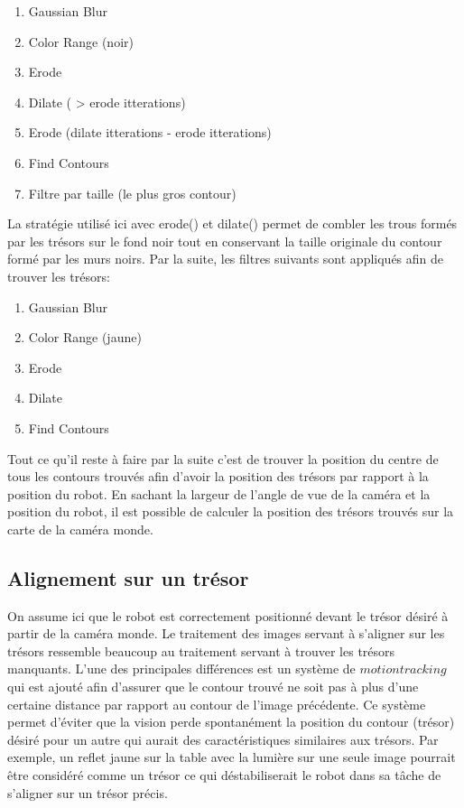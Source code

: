\begin{enumerate}
\item Gaussian Blur
\item Color Range (noir)
\item Erode
\item Dilate ( > erode itterations)
\item Erode (dilate itterations - erode itterations)
\item Find Contours
\item Filtre par taille (le plus gros contour)
\end{enumerate}

La stratégie utilisé ici avec erode() et dilate() permet de combler les trous formés par les trésors sur le fond noir tout en conservant la taille originale du contour formé par les murs noirs. Par la suite, les filtres suivants sont appliqués afin de trouver les trésors:

\begin{enumerate}
\item Gaussian Blur
\item Color Range (jaune)
\item Erode
\item Dilate 
\item Find Contours
\end{enumerate}

Tout ce qu'il reste à faire par la suite c'est de trouver la position du centre de tous les contours trouvés afin d'avoir la position des trésors par rapport à la position du robot. En sachant la largeur de l'angle de vue de la caméra et la position du robot, il est possible de calculer la position des trésors trouvés sur la carte de la caméra monde.

\subsection{Alignement sur un trésor}

On assume ici que le robot est correctement positionné devant le trésor désiré à partir de la caméra monde. Le traitement des images servant à s'aligner sur les trésors ressemble beaucoup au traitement servant à trouver les trésors manquants.  L'une des principales différences est un système de $motion tracking$ qui est ajouté afin d'assurer que le contour trouvé ne soit pas à plus d'une certaine distance par rapport au contour de l'image précédente. Ce système permet d'éviter que la vision perde spontanément la position du contour (trésor) désiré pour un autre qui aurait des caractéristiques similaires aux trésors. Par exemple, un reflet jaune sur la table avec la lumière sur une seule image pourrait être considéré comme un trésor ce qui déstabiliserait le robot dans sa tâche de s'aligner sur un trésor précis.

